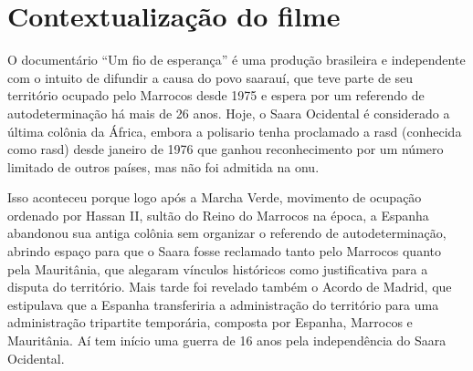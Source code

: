 	
	
	\tableofcontents 
	\textual
	
	
	
	
	
	\chapter{Contextualização do filme} \label{cap:contextualizacao}
	
	O documentário ``Um fio de esperança'' é uma produção brasileira e independente com o intuito de difundir a causa do povo saarauí, que teve parte de seu território ocupado pelo Marrocos desde 1975 e espera por um referendo de autodeterminação há mais de 26 anos. Hoje, o Saara Ocidental é considerado a última colônia da África, embora a \gls{polisario} tenha proclamado a \glsdesc{rasd} (conhecida como \gls{rasd}) desde janeiro de 1976 que ganhou reconhecimento por um número limitado de outros países, mas não foi admitida na \glsdesc{onu}.
	
	Isso aconteceu porque logo após a Marcha Verde, movimento de ocupação ordenado por Hassan II, sultão do Reino do Marrocos na época, a Espanha abandonou sua antiga colônia sem organizar o referendo de autodeterminação, abrindo espaço para que o Saara fosse reclamado tanto pelo Marrocos quanto pela Mauritânia, que alegaram vínculos históricos como justificativa para a disputa do território. Mais tarde foi revelado também o Acordo de Madrid, que estipulava que a Espanha transferiria a administração do território para uma administração tripartite temporária, composta por Espanha, Marrocos e Mauritânia. Aí tem início uma guerra de 16 anos pela independência do Saara Ocidental.
	
